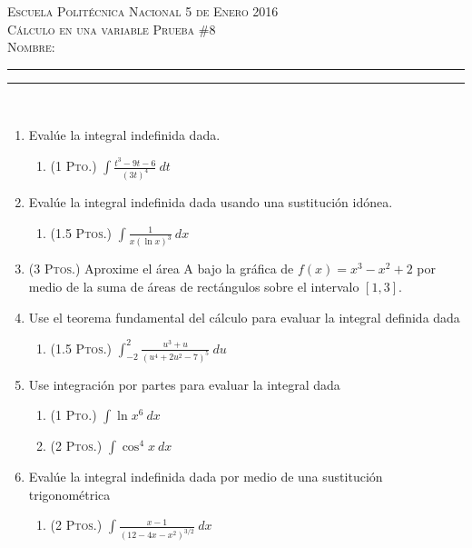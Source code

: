 \documentclass[11pt,a4paper,oneside]{article}\usepackage[]{graphicx}\usepackage[]{color}
\begin{document}
\thispagestyle{empty}
{\sf
{\Large \scshape Escuela Polit\'{e}cnica Nacional} \hfill {\scshape 5 de Enero 2016}\\[3mm] 
{\scshape C\'{a}lculo en una variable \hfill Prueba $\#8$}\\[7mm]
{\scshape Nombre:} \rule{0.6\textwidth}{0.5pt} \rule{0.1\textwidth}{0.5pt}\\
}




\begin{enumerate}
      \item Evalúe la integral indefinida dada.
      \begin{enumerate}
            \item {\scshape (1 Pto.)} $\displaystyle \int \frac{t^3-9t-6}{(3t)^4}\ dt$\\[35mm]
      \end{enumerate}
      \item Evalúe la integral indefinida dada usando una sustitución idónea.
      \begin{enumerate}
            \item {\scshape (1.5 Ptos.)} $\displaystyle \int \frac{1}{x(\ln x)^3}\ dx$\\[35mm]
      \end{enumerate}
      \item {\scshape (3 Ptos.)} Aproxime el área A bajo la gráfica de $f(x)=x^3-x^2+2$ por medio de la suma de áreas de rectángulos sobre el intervalo $[1,3]$.
      
      \newpage
      \item Use el teorema fundamental del cálculo para evaluar la integral definida dada
      \begin{enumerate}
            \item {\scshape (1.5 Ptos.)} $\displaystyle \int_{-2}^{2} \frac{u^3+u}{(u^4+2u^2-7)^5}\ du$\\[35mm]
      \end{enumerate}
      
      \item Use integración por partes para evaluar la integral dada
      \begin{enumerate}
            \item {\scshape (1 Pto.)} $\displaystyle \int \ln x^6\ dx$\\[38mm]
            \item {\scshape (2 Ptos.)} $\displaystyle \int \cos^4 x\ dx$\\[38mm]
      \end{enumerate}
      
      \item Evalúe la integral indefinida dada por medio de una sustitución trigonométrica
      \begin{enumerate}
            \item {\scshape (2 Ptos.)} $\displaystyle \int \frac{x-1}{(12-4x-x^2)^{3/2}}\ dx$
      \end{enumerate}
\end{enumerate}
\end{document}
